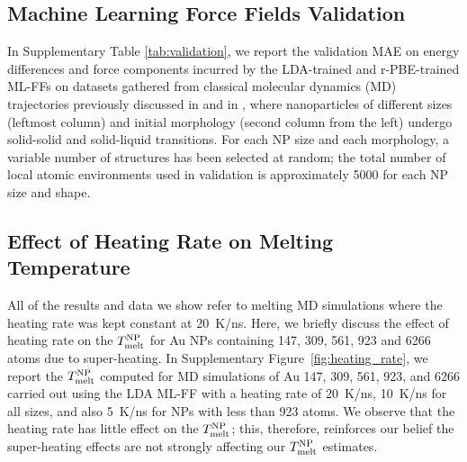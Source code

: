 \documentclass[%
aip,
 amsmath,amssymb,
 reprint,
]{revtex4-1}
\newcommand*\subt[1]{_{\textnormal{#1}}}
\newcommand*\supt[1]{^{\textnormal{#1}}}
\begin{document}
\subsection*{Machine Learning Force Fields Validation}
%
In Supplementary Table \ref{tab:validation}, we report the validation MAE on energy differences and force components incurred by the LDA-trained and r-PBE-trained ML-FFs on datasets gathered from classical molecular dynamics (MD) trajectories previously discussed in \citet{Delgado-Callico2020} and in \citet{Foster2019}, where nanoparticles of different sizes (leftmost column) and initial morphology (second column from the left) undergo solid-solid and solid-liquid transitions.
%
For each NP size and each morphology, a variable number of structures has been selected at random; the total number of local atomic environments used in validation is approximately 5000 for each NP size and shape.
%

\subsection*{Effect of Heating Rate on Melting Temperature}
%
All of the results and data we show refer to melting MD simulations where the heating rate was kept constant at 20~K/ns.
%
Here, we briefly discuss the effect of heating rate on the $T\subt{melt}\supt{NP}$ for Au NPs containing 147, 309, 561, 923 and 6266 atoms due to super-heating.
%
In Supplementary Figure~\ref{fig:heating_rate}, we report the $T\subt{melt}\supt{NP}$ computed for MD simulations of Au 147, 309, 561, 923, and 6266 carried out using the LDA ML-FF with a heating rate of 20~K/ns, 10~K/ns for all sizes, and also 5~K/ns for NPs with less than 923 atoms.
%
We observe that the heating rate has little effect on the $T\subt{melt}\supt{NP}$; this, therefore, reinforces our belief the super-heating effects are not strongly affecting our $T\subt{melt}\supt{NP}$ estimates.
%
 
\end{document}
